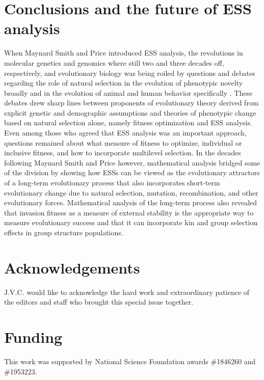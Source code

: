 \documentclass[11pt]{article}
\begin{document}
\section{Conclusions and the future of ESS analysis}

When Maynard Smith and Price \cite{Maynard-Smith:Price:1973,Maynard-Smith:1974} introduced ESS analysis, the revolutions in molecular genetics and genomics where still two and three decades off, respectively, and evolutionary biology was being roiled by questions and debates regarding the role of natural selection in the evolution of phenotypic novelty broadly \cite{Gould:Lewontin:1979} and in the evolution of animal and human behavior specifically \cite{Lewontin:1977,Hamilton:1977}. These debates drew sharp lines between proponents of evolutionary theory derived from explicit genetic and demographic assumptions and theories of phenotypic change based on natural selection alone, namely fitness optimization and ESS analysis. Even among those who agreed that ESS analysis was an important approach, questions remained about what measure of fitness to optimize, individual or inclusive fitness, and how to incorporate multilevel selection. In the decades following Maynard Smith and Price \cite{Maynard-Smith:Price:1973} however, mathematical analysis bridged some of the division by showing how ESSs can be viewed as the evolutionary attractors of a long-term evolutionary process that also incorporates short-term evolutionary change due to natural selection, mutation, recombination, and other evolutionary forces. Mathematical analysis of the long-term process also revealed that invasion fitness as a measure of external stability is the appropriate way to measure evolutionary success and that it can incorporate kin and group selection effects in group structure populations.


\cite{Leimar:2009,Mullon:Keller:2016,Mullon:Keller:2018,Mullon:Lehmann:2019}

\section{Acknowledgements}

J.V.C. would like to acknowledge the hard work and extraordinary patience of the editors and staff who brought this special issue together.

\section{Funding}

This work was supported by National Science Foundation awards \#1846260 and \#1953223.

\clearpage
\printbibliography
\end{document}
